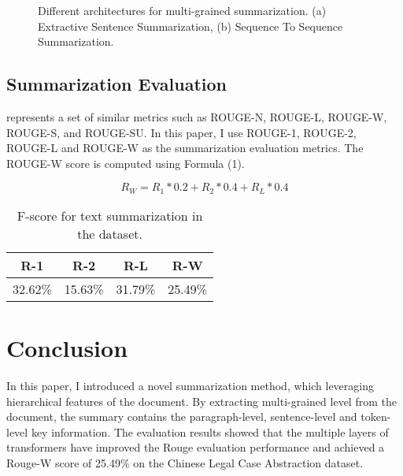 \documentclass[11pt,a4paper]{article}
\begin{document}
\begin{figure*}
\begin{center}
\end{center}
   \caption{Different architectures for multi-grained summarization.
   (a) Extractive Sentence Summarization,
   (b) Sequence To Sequence Summarization.}
\label{fig:short}
\end{figure*}

\subsection{Summarization Evaluation}

\citet{lin2004rouge} represents a set of similar metrics such as ROUGE-N, ROUGE-L, ROUGE-W, ROUGE-S, and ROUGE-SU.
In this paper, I use ROUGE-1, ROUGE-2, ROUGE-L and ROUGE-W as the summarization evaluation metrics.
The ROUGE-W score is computed using Formula (1).

\begin{equation}
  {R_W} = {R_1} * 0.2 + {R_2} * 0.4 + {R_L} * 0.4
\end{equation}

\begin{table}
\centering
\begin{tabular}{cccc}
\hline
\textbf{R-1} & \textbf{R-2} & \textbf{R-L} & \textbf{R-W} \\
\hline
32.62\% & 15.63\% & 31.79\% & 25.49\% \\
\hline
\end{tabular}
\caption{F-score for text summarization in the dataset.}
\end{table}

\section{Conclusion}

In this paper, I introduced a novel summarization method, which leveraging hierarchical features of the document.
By extracting multi-grained level from the document, the summary contains the paragraph-level, sentence-level and token-level key information.
The evaluation results showed that the multiple layers of transformers have improved the Rouge evaluation performance
and achieved a Rouge-W score of 25.49\% on the Chinese Legal Case Abstraction dataset.





\end{document}
